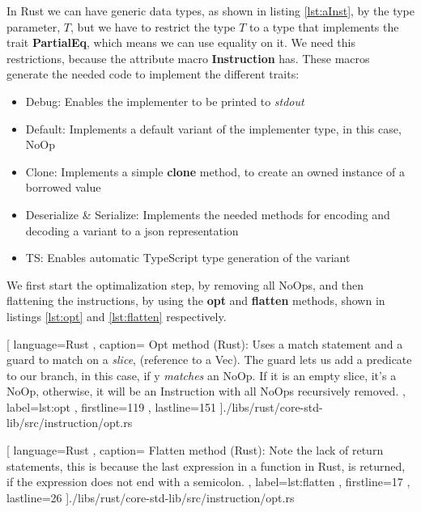 In Rust we can have generic data types, as shown in listing \ref{lst:aInst}, by
the type parameter, $T$, but we have to restrict the type $T$ to a type that
implements the trait \textbf{PartialEq}, which means we can use equality on it.
We need this restrictions, because the attribute macro \textbf{Instruction} has.
These macros generate the needed code to implement the different traits:

\begin{itemize}
  \item Debug: Enables the implementer to be printed to \textit{stdout}
  \item Default: Implements a default variant of the implementer type, in this
    case, NoOp
  \item Clone: Implements a simple \textbf{clone} method, to create an owned
    instance of a borrowed value
  \item Deserialize \& Serialize: Implements the needed methods for encoding
    and decoding a variant to a \gls{json} representation
  \item TS: Enables automatic TypeScript type generation of the variant
\end{itemize}

We first start the optimalization step, by removing all NoOps, and then
flattening the instructions, by using the \textbf{opt} and \textbf{flatten}
methods, shown in listings \ref{lst:opt} and \ref{lst:flatten} respectively.

\begin{code}[H]
  
   [ language=Rust
   , caption={
     Opt method (Rust): Uses a match statement and a guard to match on a
     \textit{slice}, (reference to a Vec). The guard lets us add a predicate to
     our branch, in this case, if y \textit{matches} an NoOp. If it is an empty
     slice, it's a NoOp, otherwise, it will be an Instruction with all NoOps
     recursively removed.
   }
   , label=lst:opt
   , firstline=119
   , lastline=151
   ]{./libs/rust/core-std-lib/src/instruction/opt.rs}
\end{code}

\begin{code}[H]
  
   [ language=Rust
   , caption={
     Flatten method (Rust): Note the lack of return statements, this is because
     the last expression in a function in Rust, is returned, if the expression
     does not end with a semicolon.
   }
   , label=lst:flatten
   , firstline=17
   , lastline=26
   ]{./libs/rust/core-std-lib/src/instruction/opt.rs}
\end{code}

